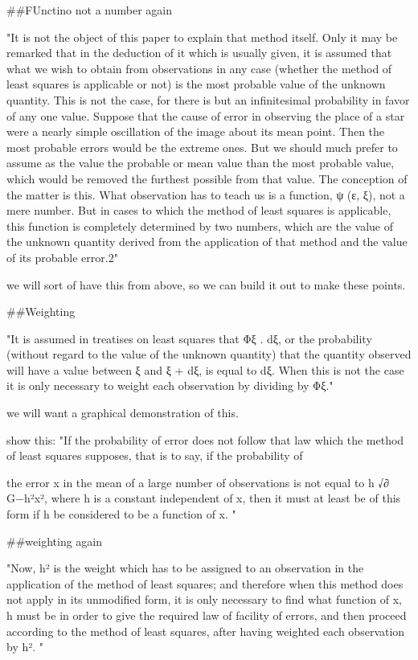 ##FUnctino not a number again

"It is not the object of this paper to explain that method itself. Only it may be remarked that in the deduction of it which is usually given, it is assumed that what we wish to obtain from observations in any case (whether the method of least squares is applicable or not) is the most probable value of the unknown quantity. This is not the case, for there is but an infinitesimal probability in favor of any one value. Suppose that the cause of error in observing the place of a star were a nearly simple oscillation of the image about its mean point. Then the most probable errors would be the extreme ones. But we should much prefer to assume as the value the probable or mean value than the most probable value, which would be removed the furthest possible from that value. The conception of the matter is this. What observation has to teach us is a function, ψ (ε, ξ), not a mere number. But in cases to which the method of least squares is applicable, this function is completely determined by two numbers, which are the value of the unknown quantity derived from the application of that method and the value of its probable error.2"

we will sort of have this from above, so we can build it out to make these points. 

##Weighting

"It is assumed in treatises on least squares that Φξ . dξ, or the probability (without regard to the value of the unknown quantity) that the quantity observed will have a value between ξ and ξ + dξ, is equal to dξ. When this is not the case it is only necessary to weight each observation by dividing by Φξ."

we will want a graphical demonstration of this. 

show this:
"If the probability of error does not follow that law which the method of least squares supposes, that is to say, if the probability of

the error x in the mean of a large number of observations is not equal to 
h
√∂
G−h²x², where h is a constant independent of x, then it must at least be of this form if h be considered to be a function of x. "



##weighting again

"Now, h² is the weight which has to be assigned to an observation in the application of the method of least squares; and therefore when this method does not apply in its unmodified form, it is only necessary to find what function of x, h must be in order to give the required law of facility of errors, and then proceed according to the method of least squares, after having weighted each observation by h². "

